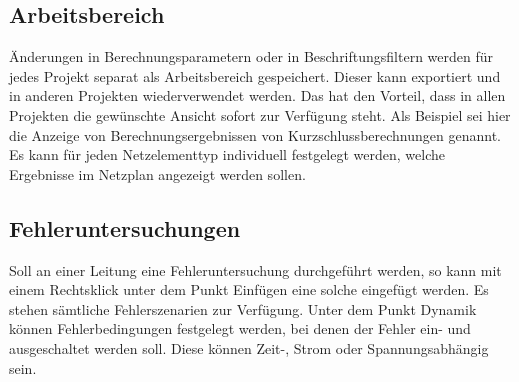 \documentclass{scrartcl}
\begin{document}
\begin{onehalfspace}
\subsection{Arbeitsbereich}
Änderungen in Berechnungsparametern oder in Beschriftungsfiltern werden für jedes Projekt separat als \glqq Arbeitsbereich\grqq{} gespeichert. Dieser kann exportiert und in anderen Projekten wiederverwendet werden. Das hat den Vorteil, dass in allen Projekten die gewünschte Ansicht sofort zur Verfügung steht. Als Beispiel sei hier die Anzeige von Berechnungsergebnissen von Kurzschlussberechnungen genannt. Es kann für jeden Netzelementtyp individuell festgelegt werden, welche Ergebnisse im Netzplan angezeigt werden sollen.

\subsection{Fehleruntersuchungen}
Soll an einer Leitung eine Fehleruntersuchung durchgeführt werden, so kann mit einem Rechtsklick unter dem Punkt Einfügen eine solche eingefügt werden. Es stehen sämtliche Fehlerszenarien zur Verfügung. Unter dem Punkt Dynamik können Fehlerbedingungen festgelegt werden, bei denen der Fehler ein- und ausgeschaltet werden soll. Diese können Zeit-, Strom oder Spannungsabhängig sein.


\end{onehalfspace}
\end{document}
